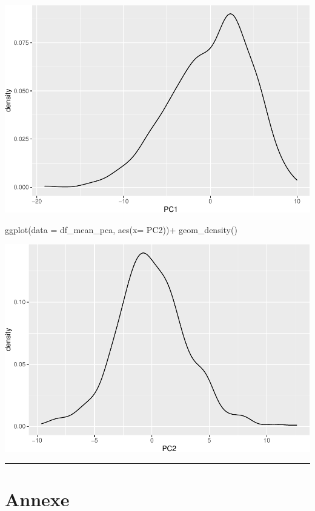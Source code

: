 \documentclass[
  11pt,
]{article}
\newenvironment{Shaded}{\begin{snugshade}}{\end{snugshade}}
\newcommand{\AttributeTok}[1]{\textcolor[rgb]{0.77,0.63,0.00}{#1}}
\newcommand{\FunctionTok}[1]{\textcolor[rgb]{0.00,0.00,0.00}{#1}}
\newcommand{\NormalTok}[1]{#1}
\newcommand{\SpecialCharTok}[1]{\textcolor[rgb]{0.00,0.00,0.00}{#1}}
\begin{document}
\includegraphics{stat_DAP_files/figure-latex/unnamed-chunk-21-2.pdf}

\begin{Shaded}
\begin{Highlighting}[]
\FunctionTok{ggplot}\NormalTok{(}\AttributeTok{data =}\NormalTok{ df\_mean\_pca, }\FunctionTok{aes}\NormalTok{(}\AttributeTok{x=}\NormalTok{ PC2))}\SpecialCharTok{+} \FunctionTok{geom\_density}\NormalTok{()}
\end{Highlighting}
\end{Shaded}

\includegraphics{stat_DAP_files/figure-latex/unnamed-chunk-21-3.pdf}

\begin{center}\rule{0.5\linewidth}{0.5pt}\end{center}

\hypertarget{annexe}{%
\section{Annexe}\label{annexe}}
\end{document}
